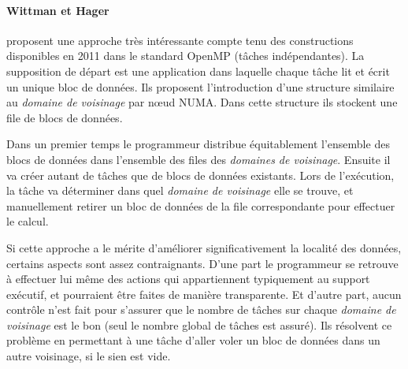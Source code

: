 \paragraph{Wittman et Hager~\cite{Wittmann2011}} proposent une approche très intéressante compte tenu des constructions disponibles en 2011 dans le standard OpenMP (tâches indépendantes).
La supposition de départ est une application dans laquelle chaque tâche lit et écrit un unique bloc de données.
Ils proposent l'introduction d'une structure similaire au \emph{domaine de voisinage} par nœud NUMA.
Dans cette structure ils stockent une file de blocs de données.

Dans un premier temps le programmeur distribue équitablement l'ensemble des blocs de données dans l'ensemble des files des \emph{domaines de voisinage}.
Ensuite il va créer autant de tâches que de blocs de données existants.
Lors de l'exécution, la tâche va déterminer dans quel \emph{domaine de voisinage} elle se trouve, et manuellement retirer un bloc de données de la file correspondante pour effectuer le calcul.

Si cette approche a le mérite d'améliorer significativement la localité des données, certains aspects sont assez contraignants.
D'une part le programmeur se retrouve à effectuer lui même des actions qui appartiennent typiquement au support exécutif, et pourraient être faites de manière transparente.
Et d'autre part, aucun contrôle n'est fait pour s'assurer que le nombre de tâches sur chaque \emph{domaine de voisinage} est le bon (seul le nombre global de tâches est assuré).
Ils résolvent ce problème en permettant à une tâche d'aller voler un bloc de données dans un autre voisinage, si le sien est vide.


